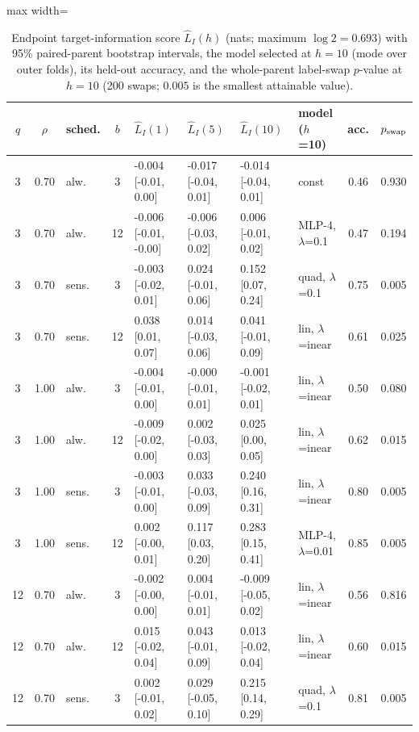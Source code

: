 \documentclass[10pt]{article}
\begin{document}
\begin{table}[htbp]
\centering
\scriptsize
\caption{Endpoint target-information score $\widehat L_I(h)$ (nats; maximum $\log 2=0.693$) with 95\% paired-parent bootstrap intervals, the model selected at $h=10$ (mode over outer folds), its held-out accuracy, and the whole-parent label-swap $p$-value at $h=10$ (200 swaps; $0.005$ is the smallest attainable value).}\label{tab:endpoint}
\begin{adjustbox}{max width=\textwidth}
\begin{tabular}{cclc lll l cc}
\toprule
$q$ & $\rho$ & sched. & $b$ & $\widehat L_I(1)$ & $\widehat L_I(5)$ & $\widehat L_I(10)$ & model ($h$=10) & acc. & $p_{\rm swap}$ \\
\midrule
3 & 0.70 & alw. & 3 & -0.004 [-0.01, 0.00] & -0.017 [-0.04, 0.01] & -0.014 [-0.04, 0.01] & const & 0.46 & 0.930 \\
3 & 0.70 & alw. & 12 & -0.006 [-0.01, -0.00] & -0.006 [-0.03, 0.02] & 0.006 [-0.01, 0.02] & MLP-4, $\lambda$=0.1 & 0.47 & 0.194 \\
3 & 0.70 & sens. & 3 & -0.003 [-0.02, 0.01] & 0.024 [-0.01, 0.06] & 0.152 [0.07, 0.24] & quad, $\lambda$=0.1 & 0.75 & 0.005 \\
3 & 0.70 & sens. & 12 & 0.038 [0.01, 0.07] & 0.014 [-0.03, 0.06] & 0.041 [-0.01, 0.09] & lin, $\lambda$=inear & 0.61 & 0.025 \\
3 & 1.00 & alw. & 3 & -0.004 [-0.01, 0.00] & -0.000 [-0.01, 0.01] & -0.001 [-0.02, 0.01] & lin, $\lambda$=inear & 0.50 & 0.080 \\
3 & 1.00 & alw. & 12 & -0.009 [-0.02, 0.00] & 0.002 [-0.03, 0.03] & 0.025 [0.00, 0.05] & lin, $\lambda$=inear & 0.62 & 0.015 \\
3 & 1.00 & sens. & 3 & -0.003 [-0.01, 0.00] & 0.033 [-0.03, 0.09] & 0.240 [0.16, 0.31] & lin, $\lambda$=inear & 0.80 & 0.005 \\
3 & 1.00 & sens. & 12 & 0.002 [-0.00, 0.01] & 0.117 [0.03, 0.20] & 0.283 [0.15, 0.41] & MLP-4, $\lambda$=0.01 & 0.85 & 0.005 \\
12 & 0.70 & alw. & 3 & -0.002 [-0.00, 0.00] & 0.004 [-0.01, 0.01] & -0.009 [-0.05, 0.02] & lin, $\lambda$=inear & 0.56 & 0.816 \\
12 & 0.70 & alw. & 12 & 0.015 [-0.02, 0.04] & 0.043 [-0.01, 0.09] & 0.013 [-0.02, 0.04] & lin, $\lambda$=inear & 0.60 & 0.015 \\
12 & 0.70 & sens. & 3 & 0.002 [-0.01, 0.02] & 0.029 [-0.05, 0.10] & 0.215 [0.14, 0.29] & quad, $\lambda$=0.1 & 0.81 & 0.005 \\

\end{tabular}
\end{adjustbox}
\end{table}
\end{document}
